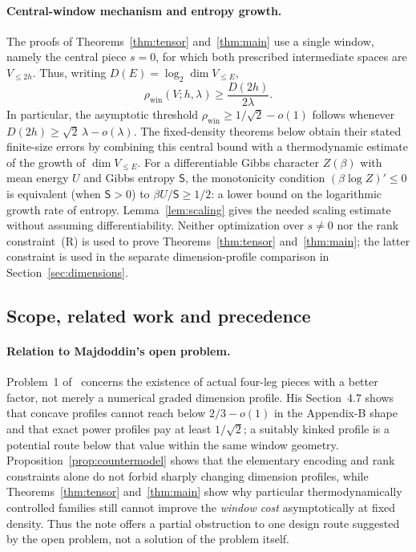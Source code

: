 \documentclass[10pt,a4paper]{article}
\numberwithin{equation}{section}
\theoremstyle{remark}\newtheorem{remark}[theorem]{Remark}\newtheorem{question}[theorem]{Question}
\newcommand{\rhow}{\rho_{\mathrm{win}}}\newcommand{\F}{\mathbb F}\newcommand{\K}{\mathbb K}\newcommand{\Z}{\mathbb Z}\newcommand{\R}{\mathbb R}\newcommand{\cB}{\mathcal L}\newcommand{\wt}{\mathrm{wt}}\newcommand{\dimn}{\operatorname{dim}}\newcommand{\supp}{\operatorname{supp}}
\begin{document}
\paragraph{Central-window mechanism and entropy growth.}
The proofs of Theorems~\ref{thm:tensor} and~\ref{thm:main} use a single window, namely the central piece $s=0$, for which both prescribed intermediate spaces are $V_{\le2h}$. Thus, writing $D(E)=\log_2\dimn V_{\le E}$,
\begin{equation}\label{eq:central-mechanism}
\rhow(V;h,\lambda)\ge\frac{D(2h)}{2\lambda}.
\end{equation}
In particular, the asymptotic threshold $\rhow\ge1/\sqrt2-o(1)$ follows whenever $D(2h)\ge\sqrt2\,\lambda-o(\lambda)$. The fixed-density theorems below obtain their stated finite-size errors by combining this central bound with a thermodynamic estimate of the growth of $\dimn V_{\le E}$. For a differentiable Gibbs character $Z(\beta)$ with mean energy $U$ and Gibbs entropy $\mathsf S$, the monotonicity condition $(\beta\log Z)'\le0$ is equivalent (when $\mathsf S>0$) to $\beta U/\mathsf S\ge1/2$: a lower bound on the logarithmic growth rate of entropy. Lemma~\ref{lem:scaling} gives the needed scaling estimate without assuming differentiability. Neither optimization over $s\ne0$ nor the rank constraint~\textup{(R)} is used to prove Theorems~\ref{thm:tensor} and~\ref{thm:main}; the latter constraint is used in the separate dimension-profile comparison in Section~\ref{sec:dimensions}.

\subsection{Scope, related work and precedence}
\paragraph{Relation to Majdoddin's open problem.}
Problem~1 of~\cite{majdoddin} concerns the existence of actual four-leg pieces with a better factor, not merely a numerical graded dimension profile. His Section~4.7 shows that concave profiles cannot reach below $2/3-o(1)$ in the Appendix-B shape and that exact power profiles pay at least $1/\sqrt2$; a suitably kinked profile is a potential route below that value within the same window geometry. Proposition~\ref{prop:countermodel} shows that the elementary encoding and rank constraints alone do not forbid sharply changing dimension profiles, while Theorems~\ref{thm:tensor} and~\ref{thm:main} show why particular thermodynamically controlled families still cannot improve the \emph{window cost} asymptotically at fixed density. Thus the note offers a partial obstruction to one design route suggested by the open problem, not a solution of the problem itself.
\end{document}
